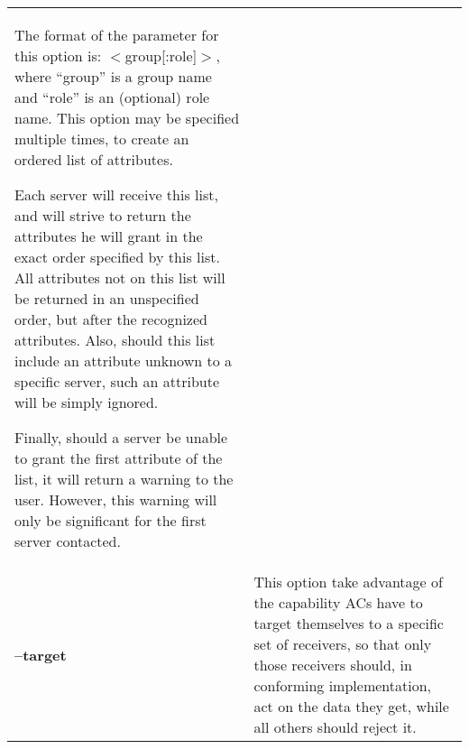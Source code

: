 \documentclass[a4paper]{book}
\begin{document}
\begin{longtable}{lp{3in}}
		      The format of the parameter for this option is:
		      $<$group[:role]$>$, where ``group'' is a group name
		      and ``role'' is an (optional) role name.  This
		      option may be specified multiple times, to create
		      an ordered list of attributes.

		      Each server will receive this list, and will
		      strive to return the attributes he will grant in
		      the exact order specified by this list.  All
		      attributes not on this list will be returned in
		      an unspecified order, but after the recognized
		      attributes.  Also, should this list include an
		      attribute unknown to a specific server, such an
		      attribute will be simply ignored.

		      Finally, should a server be unable to grant the
		      first attribute of the list, it will return a
		      warning to the user.  However, this warning will
		      only be significant for the first server
		      contacted.\\
\textbf{--target}   & This option take advantage of the capability ACs
		      have to target themselves to a specific set of
		      receivers, so that only those receivers should,
		      in conforming implementation, act on the data
		      they get, while all others should reject it.


\end{longtable}
\end{document}
